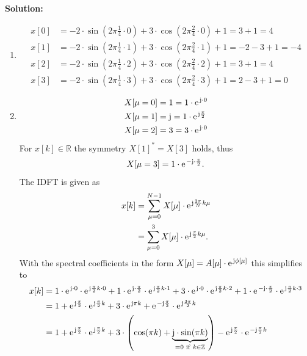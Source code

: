 \documentclass[11pt,a4paper,DIV=12]{scrartcl}
\begin{document}
\begin{Loesung}
\textbf{Solution:}
\begin{enumerate}[label=\alph*)]
	\item \begin{align}
	x[0]&=-2\cdot\sin\left(2\pi\frac{1}{4}\cdot0\right)+3\cdot\cos\left(2\pi\frac{2}{4}\cdot0\right)+1=3+1=4\nonumber\\
	x[1]&=-2\cdot\sin\left(2\pi\frac{1}{4}\cdot1\right)+3\cdot\cos\left(2\pi\frac{2}{4}\cdot1\right)+1=-2-3+1=-4\nonumber\\
	x[2]&=-2\cdot\sin\left(2\pi\frac{1}{4}\cdot2\right)+3\cdot\cos\left(2\pi\frac{2}{4}\cdot2\right)+1=3+1=4\nonumber\\
	x[3]&=-2\cdot\sin\left(2\pi\frac{1}{4}\cdot3\right)+3\cdot\cos\left(2\pi\frac{2}{4}\cdot3\right)+1=2-3+1=0\nonumber
	\end{align}
	\item \begin{align}
	X[\mu=0]&=1=1\cdot\e^{\im\cdot0}\nonumber\\
	X[\mu=1]&=\im=1\cdot\e^{\im\frac{\pi}{2}}\nonumber\\
	X[\mu=2]&=3=3\cdot\e^{\im\cdot0}\nonumber
	\end{align}
	For $x[k]\in\mathbb{R}$ the symmetry $X[1]^*=X[3]$ holds, thus
	\begin{align}
	X[\mu=3]=1\cdot\e^{-\im\cdot\frac{\pi}{2}}.\nonumber
	\end{align}
	The IDFT is given as
	\begin{align}
	x[k]&=\sum_{\mu=0}^{N-1}X[\mu]\cdot\e^{\im\frac{2\pi}{N}k\mu}\nonumber\\
	&=\sum_{\mu=0}^{3}X[\mu]\cdot\e^{\im\frac{\pi}{2}k\mu}.\nonumber
	\end{align}
	With the spectral coefficients in the form $X[\mu]=A[\mu]\cdot\e^{\im\phi[\mu]}$ this simplifies to
	\begin{align}
	x[k]&=1\cdot\e^{\im\cdot0}\cdot\e^{\im\frac{\pi}{2}k\cdot0}+1\cdot\e^{\im\cdot\frac{\pi}{2}}\cdot\e^{\im\frac{\pi}{2}k\cdot1}+3\cdot\e^{\im\cdot0}\cdot\e^{\im\frac{\pi}{2}k\cdot2}+1\cdot\e^{-\im\cdot\frac{\pi}{2}}\cdot\e^{\im\frac{\pi}{2}k\cdot3}\nonumber\\
	&=1+\e^{\im\frac{\pi}{2}}\cdot\e^{\im\frac{\pi}{2}k}+3\cdot\e^{\im\pi k}+\e^{-\im\frac{\pi}{2}}\cdot\e^{\im\frac{3\pi}{2}k}\nonumber\\
	&=1+\e^{\im\frac{\pi}{2}}\cdot\e^{\im\frac{\pi}{2}k}+3\cdot\left(\cos(\pi k)+\underbrace{\im\cdot\sin(\pi k)}_{=0\,\,\mathrm{if}\,\,k\in\mathbb{Z}}\right)-\e^{\im\frac{\pi}{2}}\cdot\e^{-\im\frac{\pi}{2}k}\nonumber\\

\end{align}
\end{enumerate}
\end{Loesung}
\end{document}
